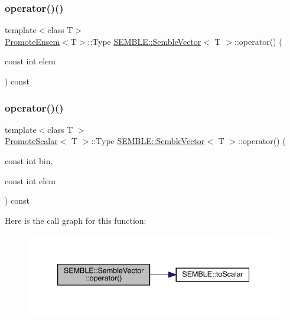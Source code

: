 \subsubsection{\texorpdfstring{operator()()}{operator()()}\hspace{0.1cm}{\footnotesize\ttfamily [2/4]}}
{\footnotesize\ttfamily template$<$class T$>$ \\
\mbox{\hyperlink{structSEMBLE_1_1PromoteEnsem}{Promote\+Ensem}}$<$T$>$\+::Type \mbox{\hyperlink{structSEMBLE_1_1SembleVector}{S\+E\+M\+B\+L\+E\+::\+Semble\+Vector}}$<$ T $>$\+::operator() (\begin{DoxyParamCaption}\item[{const int}]{elem }\end{DoxyParamCaption}) const\hspace{0.3cm}{\ttfamily [inline]}}

\mbox{\label{structSEMBLE_1_1SembleVector_a0e3c396d32b718a3deba78a6da167bf9}} 
\subsubsection{\texorpdfstring{operator()()}{operator()()}\hspace{0.1cm}{\footnotesize\ttfamily [3/4]}}
{\footnotesize\ttfamily template$<$class T $>$ \\
\mbox{\hyperlink{structSEMBLE_1_1PromoteScalar}{Promote\+Scalar}}$<$ T $>$\+::Type \mbox{\hyperlink{structSEMBLE_1_1SembleVector}{S\+E\+M\+B\+L\+E\+::\+Semble\+Vector}}$<$ T $>$\+::operator() (\begin{DoxyParamCaption}\item[{const int}]{bin,  }\item[{const int}]{elem }\end{DoxyParamCaption}) const}

Here is the call graph for this function\+:
\nopagebreak
\begin{figure}[H]
\begin{center}
\leavevmode
\includegraphics[width=339pt]{d9/d94/structSEMBLE_1_1SembleVector_a0e3c396d32b718a3deba78a6da167bf9_cgraph}
\end{center}
\end{figure}
\mbox{\label{structSEMBLE_1_1SembleVector_af05406732af89745b53fa34cf7cb7580}} 
